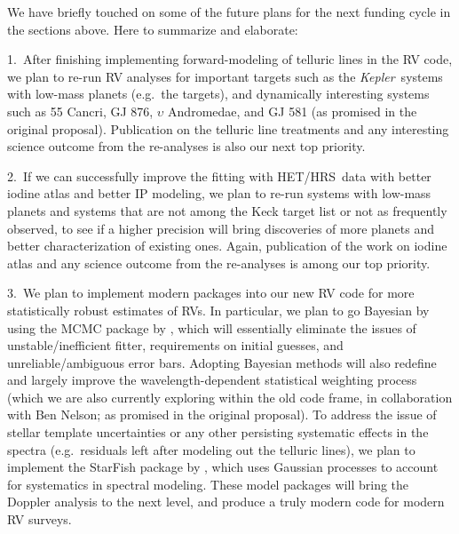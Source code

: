 \documentclass[12pt]{article}
\def\kepler{{\it Kepler}}
\def\hrs{HET/HRS}
\begin{document}
We have briefly touched on some of the future plans for the next
funding cycle in the sections above. Here to summarize and elaborate:

1.\ After finishing implementing forward-modeling of telluric lines in
the RV code, we plan to re-run RV analyses for important targets such
as the \kepler\ systems with low-mass planets (e.g.\ the
\citealt{Marcy2014} targets), and dynamically interesting systems such
as 55 Cancri, GJ 876, $\upsilon$ Andromedae, and GJ 581 (as promised
in the original proposal). Publication on the telluric line treatments
and any interesting science outcome from the re-analyses is also our
next top priority.

2.\ If we can successfully improve the fitting with \hrs\ data with
better iodine atlas and better IP modeling, we plan to re-run systems
with low-mass planets and systems that are not among the Keck target
list or not as frequently observed, to see if a higher precision will
bring discoveries of more planets and better characterization of
existing ones. Again, publication of the work on iodine atlas and any
science outcome from the re-analyses is among our top priority.

3.\ We plan to implement modern packages into our new RV code for more
statistically robust estimates of RVs. In particular, we plan to go
Bayesian by using the MCMC package by \cite{emcee}, which will
essentially eliminate the issues of unstable/inefficient fitter,
requirements on initial guesses, and unreliable/ambiguous error
bars. Adopting Bayesian methods will also redefine and largely improve
the wavelength-dependent statistical weighting process (which we are
also currently exploring within the old code frame, in collaboration
with Ben Nelson; as promised in the original proposal). To address the
issue of stellar template uncertainties or any other persisting
systematic effects in the spectra (e.g.\ residuals left after modeling
out the telluric lines), we plan to implement the StarFish package by
\cite{starfish}, which uses Gaussian processes to account for
systematics in spectral modeling. These model packages will bring the
Doppler analysis to the next level, and produce a truly modern code
for modern RV surveys.



\vspace{-3pt}
{\small %
 }


\end{document}
